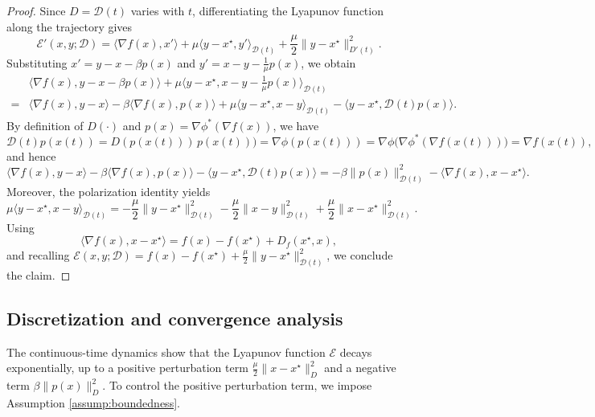 \documentclass{article}
\theoremstyle{plain}
\newtheorem{assumption}{Assumption}
\theoremstyle{remark}
\begin{document}
\begin{proof}
Since $D=\mathcal D(t)$ varies with $t$, differentiating the Lyapunov function along the trajectory gives
$$
\mathcal{E}'(x,y;\mathcal D)
=\langle \nabla f(x),x'\rangle+\mu\langle y-x^\star,y'\rangle_{\mathcal D(t)}+\frac{\mu}{2}\|y-x^\star\|_{D'(t)}^2.
$$
Substituting $x'=y-x-\beta p(x)$ and $y'=x-y-\tfrac{1}{\mu}p(x)$, we obtain
$$
\begin{aligned}
{}& \langle \nabla f(x),y-x-\beta p(x)\rangle + \mu\langle y-x^\star,x-y-\tfrac{1}{\mu}p(x)\rangle_{\mathcal D(t)}
\\
={}& \langle \nabla f(x),y-x\rangle-\beta\langle \nabla f(x),p(x)\rangle+\mu\langle y-x^\star,x-y\rangle_{\mathcal D(t)}
-\langle y-x^\star, \mathcal D(t)p(x)\rangle.
\end{aligned}
$$
By definition of $D(\cdot)$ and $p(x)=\nabla\phi^*(\nabla f(x))$, we have
$$
\mathcal D(t)p(x(t))=D(p(x(t)))\,p(x(t)))=\nabla\phi(p(x(t)))=\nabla\phi\bigl(\nabla\phi^*(\nabla f(x(t)))\bigr)=\nabla f(x(t)),
$$
and hence
$$
\langle \nabla f(x),y-x\rangle-\beta\langle \nabla f(x),p(x)\rangle-\langle y-x^\star, \mathcal D(t)p(x)\rangle
=-\beta\|p(x)\|_{\mathcal D(t)}^2-\langle \nabla f(x),x-x^\star\rangle.
$$
Moreover, the polarization identity yields
$$
\mu\langle y-x^\star,x-y\rangle_{\mathcal D(t)}
=-\frac{\mu}{2}\|y-x^\star\|_{\mathcal D(t)}^2-\frac{\mu}{2}\|x-y\|_{\mathcal D(t)}^2+\frac{\mu}{2}\|x-x^\star\|_{\mathcal D(t)}^2.
$$
Using
$$
\langle \nabla f(x),x-x^\star\rangle = f(x)-f(x^\star) + D_f(x^\star,x),
$$
and recalling $\mathcal{E}(x,y;\mathcal D)=f(x)-f(x^\star)+\frac{\mu}{2}\|y-x^\star\|_{\mathcal D(t)}^2$, we conclude the claim.
\end{proof}

\subsection{Discretization and convergence analysis}

The continuous-time dynamics show that the Lyapunov function $\mathcal{E}$ decays exponentially, up to a positive perturbation term $\frac{\mu}{2}\|x-x^\star\|_{D}^2$ and a negative term $\beta\|p(x)\|_{D}^2$. To control the positive perturbation term, we impose Assumption \ref{assump:boundedness}.

\end{document}
